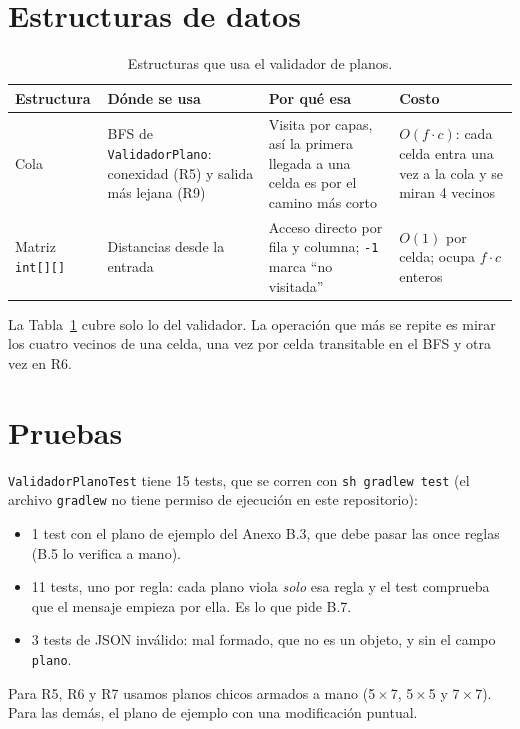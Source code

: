 \documentclass[11pt,a4paper]{article}
\begin{document}
\section{Estructuras de datos}

\begin{table}[h]
\centering
\begin{tabularx}{\textwidth}{lXXX}
\toprule
Estructura & D\'onde se usa & Por qu\'e esa & Costo \\
\midrule
Cola & BFS de \texttt{ValidadorPlano}: conexidad (R5) y salida m\'as lejana (R9)
     & Visita por capas, as\'i la primera llegada a una celda es por el camino
       m\'as corto
     & $O(f \cdot c)$: cada celda entra una vez a la cola y se miran 4 vecinos \\
Matriz \texttt{int[][]} & Distancias desde la entrada
     & Acceso directo por fila y columna; \texttt{-1} marca ``no visitada''
     & $O(1)$ por celda; ocupa $f \cdot c$ enteros \\
\bottomrule
\end{tabularx}
\caption{Estructuras que usa el validador de planos.}
\label{tab:estructuras-validador}
\end{table}

La Tabla~\ref{tab:estructuras-validador} cubre solo lo del validador. La
operaci\'on que m\'as se repite es mirar los cuatro vecinos de una celda, una vez
por celda transitable en el BFS y otra vez en R6.

\section{Pruebas}

\texttt{ValidadorPlanoTest} tiene 15 tests, que se corren con
\texttt{sh gradlew test} (el archivo \texttt{gradlew} no tiene permiso de
ejecuci\'on en este repositorio):

\begin{itemize}[nosep]
  \item 1 test con el plano de ejemplo del Anexo B.3, que debe pasar las once
        reglas (B.5 lo verifica a mano).
  \item 11 tests, uno por regla: cada plano viola \emph{solo} esa regla y el
        test comprueba que el mensaje empieza por ella. Es lo que pide B.7.
  \item 3 tests de JSON inv\'alido: mal formado, que no es un objeto, y sin el
        campo \texttt{plano}.
\end{itemize}

Para R5, R6 y R7 usamos planos chicos armados a mano (5\,$\times$\,7, 5\,$\times$\,5
y 7\,$\times$\,7). Para las dem\'as, el plano de ejemplo con una modificaci\'on
puntual.
\end{document}
